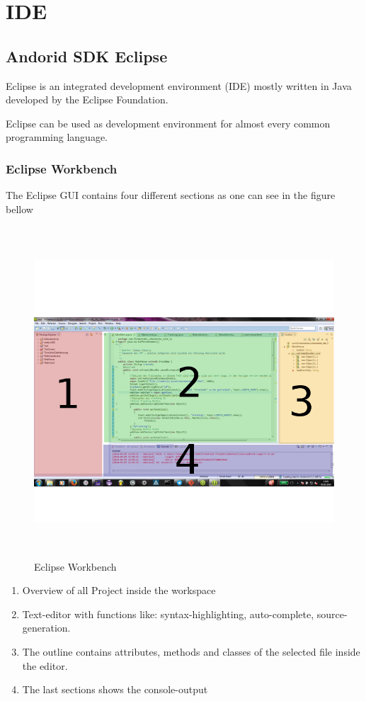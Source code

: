 \chapter{IDE}


\section{Andorid SDK Eclipse}

Eclipse is an integrated development environment (IDE) mostly written in Java developed by the Eclipse Foundation.

Eclipse can be used as development environment for almost every common programming language. 

\subsection{Eclipse Workbench}
The Eclipse GUI contains four different sections as one can see in the figure bellow
\\ 
\begin{figure}[h]
\centering
\includegraphics[width=400pt,height=350pt,keepaspectratio]{graphics/eclipse.png}
\caption{Eclipse Workbench}
\end{figure}

\begin{enumerate}
\item Overview of all Project inside the workspace
\item Text-editor with functions like: syntax-highlighting, auto-complete, source-generation.
\item The outline contains attributes, methods and classes of the selected file inside the editor. 
\item The last sections shows the console-output     
\end{enumerate}
\newpage
